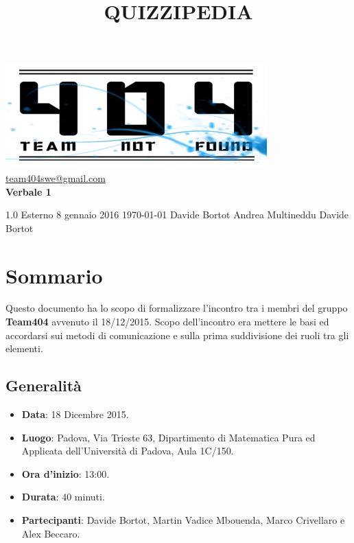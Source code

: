 \documentclass[a4paper,11pt]{article}
\title{\textbf{{\fontsize{10mm}{6mm}\selectfont QUIZZIPEDIA}}}
\begin{document}
	\maketitle
	
	\begin{center}

	\includegraphics{../../team_not_found.jpg}\\	
	\fontsize{5mm}{3mm}\url{team404swe@gmail.com}\\
	\vspace{40mm}
	\textbf{ Verbale 1 }
	\end{center}
	\thispagestyle{empty}	%
			{1.0} 							%
			{Esterno} 						%
			{8 gennaio 2016} 				%
			{\today} 						%
			{Davide Bortot}					%
			{Andrea Multineddu} 			%
			{Davide Bortot} 				%
	
	\newpage
	\section{Sommario}
	Questo documento ha lo scopo di formalizzare l'incontro tra i membri del gruppo \textbf{Team404} avvenuto il 18/12/2015. Scopo dell'incontro era mettere le basi ed accordarsi sui metodi di comunicazione e sulla prima suddivisione dei ruoli tra gli elementi.
	\subsection{Generalità}
	\begin{itemize}
	\item\textbf{Data}: 18 Dicembre 2015.
	\item\textbf{Luogo}: Padova, Via Trieste 63, Dipartimento di Matematica Pura ed Applicata dell'Università di Padova, Aula 1C/150.
	\item\textbf{Ora d'inizio}: 13:00.
	\item\textbf{Durata}: 40 minuti.
	\item\textbf{Partecipanti}: Davide Bortot, Martin Vadice Mbouenda, Marco Crivellaro e Alex Beccaro.
	\end{itemize}
\end{document}

